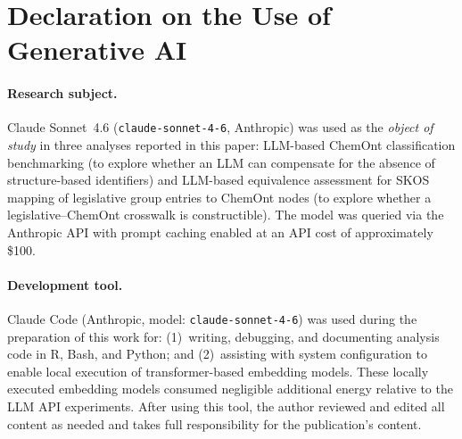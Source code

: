\section*{Declaration on the Use of Generative AI}

\paragraph{Research subject.}
Claude Sonnet~4.6 (\texttt{claude-sonnet-4-6}, Anthropic) was used as the \emph{object of study} in three analyses reported in this paper: LLM-based ChemOnt classification benchmarking (to explore whether an LLM can compensate for the absence of structure-based identifiers) and LLM-based equivalence assessment for SKOS mapping of legislative group entries to ChemOnt nodes (to explore whether a legislative--ChemOnt crosswalk is constructible). The model was queried via the Anthropic API with prompt caching enabled at an API cost of approximately \$100.

\paragraph{Development tool.}
Claude Code (Anthropic, model: \texttt{claude-sonnet-4-6}) was used during the preparation of this work for: (1)~writing, debugging, and documenting analysis code in R, Bash, and Python; and (2)~assisting with system configuration to enable local execution of transformer-based embedding models. These locally executed embedding models consumed negligible additional energy relative to the LLM API experiments. After using this tool, the author reviewed and edited all content as needed and takes full responsibility for the publication’s content.
